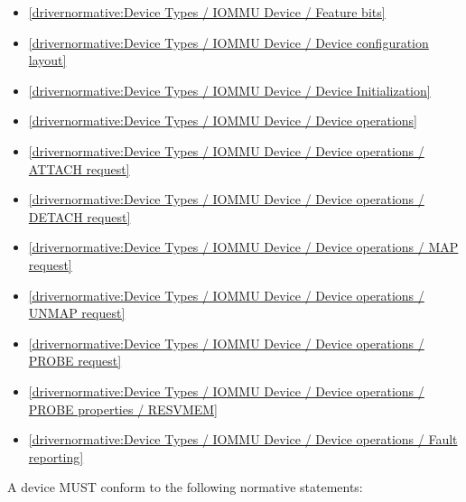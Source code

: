 \begin{itemize}
\item \ref{drivernormative:Device Types / IOMMU Device / Feature bits}
\item \ref{drivernormative:Device Types / IOMMU Device / Device configuration layout}
\item \ref{drivernormative:Device Types / IOMMU Device / Device Initialization}
\item \ref{drivernormative:Device Types / IOMMU Device / Device operations}
\item \ref{drivernormative:Device Types / IOMMU Device / Device operations / ATTACH request}
\item \ref{drivernormative:Device Types / IOMMU Device / Device operations / DETACH request}
\item \ref{drivernormative:Device Types / IOMMU Device / Device operations / MAP request}
\item \ref{drivernormative:Device Types / IOMMU Device / Device operations / UNMAP request}
\item \ref{drivernormative:Device Types / IOMMU Device / Device operations / PROBE request}
\item \ref{drivernormative:Device Types / IOMMU Device / Device operations / PROBE properties / RESVMEM}
\item \ref{drivernormative:Device Types / IOMMU Device / Device operations / Fault reporting}
\end{itemize}

\label{sec:Conformance / Device Conformance}

A device MUST conform to the following normative statements:

